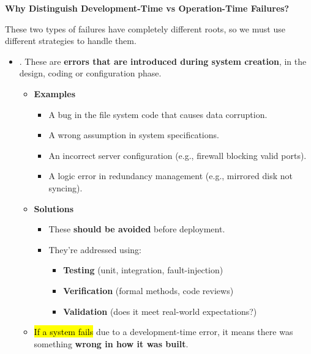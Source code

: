 \highspace
\begin{flushleft}
    \textcolor{Green3}{ \textbf{Why Distinguish Development-Time vs Operation-Time Failures?}}
\end{flushleft}
These two types of failures have completely different roots, so we must use different strategies to handle them. 
\begin{itemize}
    \item {}. These are \textbf{errors that are introduced during system creation}, in the design, coding or configuration phase.

    \begin{itemize}
        \item[\textcolor{Green3}{\faIcon{tools}}] \textcolor{Green3}{\textbf{Examples}}
        \begin{itemize}
            \item A bug in the file system code that causes data corruption.
            \item A wrong assumption in system specifications.
            \item An incorrect server configuration (e.g., firewall blocking valid ports).
            \item A logic error in redundancy management (e.g., mirrored disk not syncing).
        \end{itemize}
        \item[\textcolor{Green3}{\faIcon{check}}] \textcolor{Green3}{\textbf{Solutions}}
        \begin{itemize}
            \item These \textbf{should be avoided} before deployment.
            \item They're addressed using:
            \begin{itemize}
                \item \textbf{Testing} (unit, integration, fault-injection)
                \item \textbf{Verification} (formal methods, code reviews)
                \item \textbf{Validation} (does it meet real-world expectations?)
            \end{itemize}
        \end{itemize}
        \item[\textcolor{Red2}{\faIcon{exclamation-triangle}}] \hl{If a system fails} due to a development-time error, it means there was something \textbf{wrong in how it was built}.
    \end{itemize}
    


\end{itemize}
